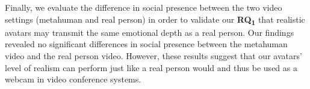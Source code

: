 Finally, we evaluate the difference in social presence between the two video settings (metahuman and real person) in order to validate our \textbf{RQ\textsubscript{1}} that realistic avatars may transmit the same emotional depth as a real person. Our findings revealed no significant differences in social presence between the metahuman video and the real person video. However, these results suggest that our avatars' level of realism can perform just like a real person would and thus be used as a webcam in video conference systems.